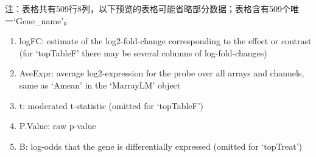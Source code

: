\documentclass[
]{article}
\providecommand{\tightlist}{%
  \setlength{\itemsep}{0pt}\setlength{\parskip}{0pt}}
\begin{document}
\begin{center}\begin{tcolorbox}[colback=gray!10, colframe=gray!50, width=0.9\linewidth, arc=1mm, boxrule=0.5pt]注：表格共有509行8列，以下预览的表格可能省略部分数据；表格含有509个唯一`Gene\_name'。
\end{tcolorbox}
\end{center}
\begin{center}\begin{tcolorbox}[colback=gray!10, colframe=gray!50, width=0.9\linewidth, arc=1mm, boxrule=0.5pt]\begin{enumerate}\tightlist
\item logFC:  estimate of the log2-fold-change corresponding to the effect or contrast (for ‘topTableF’ there may be several columns of log-fold-changes)
\item AveExpr:  average log2-expression for the probe over all arrays and channels, same as ‘Amean’ in the ‘MarrayLM’ object
\item t:  moderated t-statistic (omitted for ‘topTableF’)
\item P.Value:  raw p-value
\item B:  log-odds that the gene is differentially expressed (omitted for ‘topTreat’)
\end{enumerate}\end{tcolorbox}
\end{center}
\end{document}
